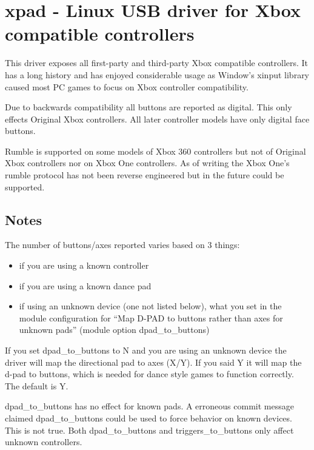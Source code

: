 \documentclass[a4paper,8pt,english]{sphinxmanual}
\begin{document}
\section{xpad - Linux USB driver for Xbox compatible controllers}
\label{input/devices/xpad:xpad-linux-usb-driver-for-xbox-compatible-controllers}\label{input/devices/xpad::doc}
This driver exposes all first-party and third-party Xbox compatible
controllers. It has a long history and has enjoyed considerable usage
as Window's xinput library caused most PC games to focus on Xbox
controller compatibility.

Due to backwards compatibility all buttons are reported as digital.
This only effects Original Xbox controllers. All later controller models
have only digital face buttons.

Rumble is supported on some models of Xbox 360 controllers but not of
Original Xbox controllers nor on Xbox One controllers. As of writing
the Xbox One's rumble protocol has not been reverse engineered but in
the future could be supported.


\subsection{Notes}
\label{input/devices/xpad:notes}
The number of buttons/axes reported varies based on 3 things:
\begin{itemize}
\item {} 
if you are using a known controller

\item {} 
if you are using a known dance pad

\item {} 
if using an unknown device (one not listed below), what you set in the
module configuration for ``Map D-PAD to buttons rather than axes for unknown
pads'' (module option dpad\_to\_buttons)

\end{itemize}

If you set dpad\_to\_buttons to N and you are using an unknown device
the driver will map the directional pad to axes (X/Y).
If you said Y it will map the d-pad to buttons, which is needed for dance
style games to function correctly. The default is Y.

dpad\_to\_buttons has no effect for known pads. A erroneous commit message
claimed dpad\_to\_buttons could be used to force behavior on known devices.
This is not true. Both dpad\_to\_buttons and triggers\_to\_buttons only affect
unknown controllers.
\end{document}
